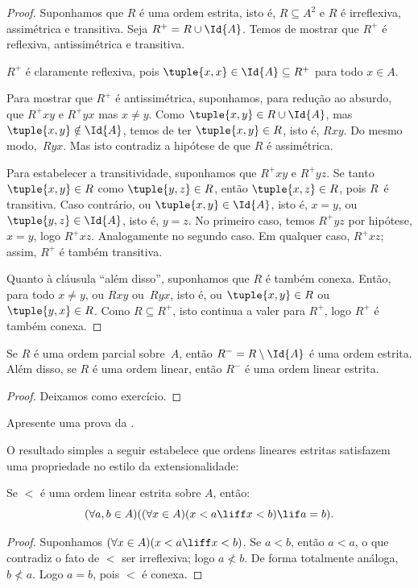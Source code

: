 \documentclass[../../../include/open-logic-section]{subfiles}
\begin{document}
\begin{proof}
Suponhamos que $R$ é uma ordem estrita, isto é, $R \subseteq A^2$ e $R$ é
irreflexiva, assimétrica e transitiva. Seja $R^+ = R \cup \Id{A}$. Temos
de mostrar que $R^+$ é reflexiva, antissimétrica e transitiva.

$R^+$ é claramente reflexiva, pois $\tuple{x, x} \in \Id{A} \subseteq
R^+$ para todo $x \in A$.

Para mostrar que $R^+$ é antissimétrica, suponhamos, para redução ao absurdo, que $R^+xy$ e
$R^+yx$ mas $x \neq y$. Como $\tuple{x,y} \in R \cup \Id{A}$, mas
$\tuple{x, y} \notin \Id{A}$, temos de ter $\tuple{x, y} \in R$, isto é,
$Rxy$. Do mesmo modo,~$Ryx$. Mas isto contradiz a hipótese de que
$R$ é assimétrica.

Para estabelecer a transitividade, suponhamos que $R^+xy$ e $R^+yz$. Se tanto
$\tuple{x, y} \in R$ como $\tuple{y,z} \in R$, então $\tuple{x, z} \in
R$, pois $R$~é transitiva. Caso contrário, ou $\tuple{x, y} \in
\Id{A}$, isto é, $x = y$, ou $\tuple{y, z} \in \Id{A}$, isto é, $y = z$.
No primeiro caso, temos $R^+yz$ por hipótese, $x = y$, logo
$R^+xz$. Analogamente no segundo caso. Em qualquer caso, $R^+xz$; assim,
$R^+$ é também transitiva.

Quanto à cláusula ``além disso'', suponhamos que $R$ é também conexa.
Então, para todo $x \neq y$, ou $Rxy$ ou~$Ryx$, isto é, ou
$\tuple{x, y} \in R$ ou $\tuple{y, x} \in R$. Como $R \subseteq R^+$,
isto continua a valer para $R^+$, logo $R^+$ é também conexa.
\end{proof}

\begin{prop}
Se $R$ é uma ordem parcial sobre~$A$, então $R^- = R \setminus \Id{A}$ é uma
ordem estrita. Além disso, se $R$ é uma ordem linear, então $R^-$ é uma ordem
linear estrita.
\end{prop}

\begin{proof}
Deixamos como exercício.
\end{proof}

\begin{prob}
Apresente uma prova da .
\end{prob}

O resultado simples a seguir estabelece que ordens lineares estritas
satisfazem uma propriedade no estilo da extensionalidade:

\begin{prop}
Se $<$ é uma ordem linear estrita sobre $A$, então:
\[
  (\forall a, b \in A)((\forall x \in A)(x < a \liff x < b) \lif a = b).
\]
\end{prop}

\begin{proof}
Suponhamos $(\forall x \in A)(x < a \liff x < b)$. Se $a < b$, então $a <
a$, o que contradiz o fato de $<$ ser irreflexiva; logo $a \nless b$.
De forma totalmente análoga, $b \nless a$. Logo $a = b$, pois $<$ é conexa.
\end{proof}
\end{document}
